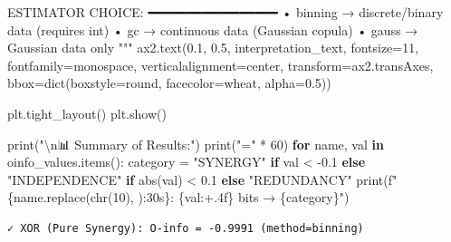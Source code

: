 \documentclass[
  11pt,
  letterpaper,
  oneside,
  openany]{book}
\newenvironment{Shaded}{\begin{snugshade}}{\end{snugshade}}
\newcommand{\BuiltInTok}[1]{\textcolor[rgb]{0.00,0.23,0.31}{#1}}
\newcommand{\CharTok}[1]{\textcolor[rgb]{0.13,0.47,0.30}{#1}}
\newcommand{\ControlFlowTok}[1]{\textcolor[rgb]{0.00,0.23,0.31}{\textbf{#1}}}
\newcommand{\DecValTok}[1]{\textcolor[rgb]{0.68,0.00,0.00}{#1}}
\newcommand{\FloatTok}[1]{\textcolor[rgb]{0.68,0.00,0.00}{#1}}
\newcommand{\KeywordTok}[1]{\textcolor[rgb]{0.00,0.23,0.31}{\textbf{#1}}}
\newcommand{\NormalTok}[1]{\textcolor[rgb]{0.00,0.23,0.31}{#1}}
\newcommand{\OperatorTok}[1]{\textcolor[rgb]{0.37,0.37,0.37}{#1}}
\newcommand{\SpecialCharTok}[1]{\textcolor[rgb]{0.37,0.37,0.37}{#1}}
\newcommand{\SpecialStringTok}[1]{\textcolor[rgb]{0.13,0.47,0.30}{#1}}
\newcommand{\StringTok}[1]{\textcolor[rgb]{0.13,0.47,0.30}{#1}}
\begin{document}
\begin{Shaded}
\begin{Highlighting}[]
\StringTok{ESTIMATOR CHOICE:}
\StringTok{━━━━━━━━━━━━━━━━━}
\StringTok{• \textquotesingle{}binning\textquotesingle{} → discrete/binary data (requires int)}
\StringTok{• \textquotesingle{}gc\textquotesingle{} → continuous data (Gaussian copula)}
\StringTok{• \textquotesingle{}gauss\textquotesingle{} → Gaussian data only}
\StringTok{"""}
\NormalTok{ax2.text(}\FloatTok{0.1}\NormalTok{, }\FloatTok{0.5}\NormalTok{, interpretation\_text, fontsize}\OperatorTok{=}\DecValTok{11}\NormalTok{, fontfamily}\OperatorTok{=}\StringTok{\textquotesingle{}monospace\textquotesingle{}}\NormalTok{,}
\NormalTok{         verticalalignment}\OperatorTok{=}\StringTok{\textquotesingle{}center\textquotesingle{}}\NormalTok{, transform}\OperatorTok{=}\NormalTok{ax2.transAxes,}
\NormalTok{         bbox}\OperatorTok{=}\BuiltInTok{dict}\NormalTok{(boxstyle}\OperatorTok{=}\StringTok{\textquotesingle{}round\textquotesingle{}}\NormalTok{, facecolor}\OperatorTok{=}\StringTok{\textquotesingle{}wheat\textquotesingle{}}\NormalTok{, alpha}\OperatorTok{=}\FloatTok{0.5}\NormalTok{))}

\NormalTok{plt.tight\_layout()}
\NormalTok{plt.show()}

\BuiltInTok{print}\NormalTok{(}\StringTok{"}\CharTok{\textbackslash{}n}\StringTok{📊 Summary of Results:"}\NormalTok{)}
\BuiltInTok{print}\NormalTok{(}\StringTok{"="} \OperatorTok{*} \DecValTok{60}\NormalTok{)}
\ControlFlowTok{for}\NormalTok{ name, val }\KeywordTok{in}\NormalTok{ oinfo\_values.items():}
\NormalTok{    category }\OperatorTok{=} \StringTok{"SYNERGY"} \ControlFlowTok{if}\NormalTok{ val }\OperatorTok{\textless{}} \OperatorTok{{-}}\FloatTok{0.1} \ControlFlowTok{else} \StringTok{"INDEPENDENCE"} \ControlFlowTok{if} \BuiltInTok{abs}\NormalTok{(val) }\OperatorTok{\textless{}} \FloatTok{0.1} \ControlFlowTok{else} \StringTok{"REDUNDANCY"}
    \BuiltInTok{print}\NormalTok{(}\SpecialStringTok{f"}\SpecialCharTok{\{}\NormalTok{name}\SpecialCharTok{.}\NormalTok{replace(}\BuiltInTok{chr}\NormalTok{(}\DecValTok{10}\NormalTok{), }\StringTok{\textquotesingle{} \textquotesingle{}}\NormalTok{)}\SpecialCharTok{:30s\}}\SpecialStringTok{: }\SpecialCharTok{\{}\NormalTok{val}\SpecialCharTok{:+.4f\}}\SpecialStringTok{ bits → }\SpecialCharTok{\{}\NormalTok{category}\SpecialCharTok{\}}\SpecialStringTok{"}\NormalTok{)}
\end{Highlighting}
\end{Shaded}

\begin{verbatim}
✓ XOR (Pure Synergy): O-info = -0.9991 (method=binning)
\end{verbatim}
\end{document}
